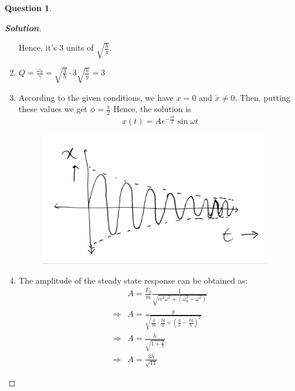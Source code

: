 \documentclass[10pt]{scrartcl}
\theoremstyle{definition}
\newtheorem{exercise}{Question}
\newenvironment{solution} {\begin{proof}[\normalfont \textbf{Solution}]} {\end{proof}}
\begin{document}
\begin{exercise}
\begin{solution}
\begin{enumerate}[label={(\alph*)}]
                Hence, it's $3$ units of $\sqrt{\frac{h}{g}}$.
            \item $Q = \frac{\omega_0}{\gamma} = \sqrt{\frac{g}{h}} \cdot 3\sqrt{\frac{h}{g}} = 3$
            \item  According to the given conditions, we have $x = 0$ and $\dot{x} \neq 0$. Then, putting these values
                we get $\boxed{\phi = \frac{\pi}{2}}$ Hence, the solution is 
                $$\boxed{x(t) = Ae^{-\frac{\alpha t}{2}}\sin\omega t}$$
                \begin{figure}[h]
                    \centering
                    \includegraphics[width = 4.0in]{damped.jpg}
                \end{figure}
            \item The amplitude of the steady state response can be obtained as:
                \begin{align*}
                    &A = \frac{F_0}{m} \frac{1}{\sqrt{\alpha^2\omega^2 + (\omega_0^2 - \omega^2)}} \\ 
                    \Rightarrow &A = \frac{g}{\sqrt{\frac{g}{9h}\cdot \frac{2g}{h} + (\frac{g}{h} - \frac{2g}{h})^2}} \\ 
                    \Rightarrow &A = \frac{h}{\sqrt{1 + \frac{2}{9}}} \\ 
                    \Rightarrow &\boxed{A = \frac{3h}{\sqrt{11}}}
                \end{align*}
        \end{enumerate}
    \end{solution}
\end{exercise}
\end{document}
